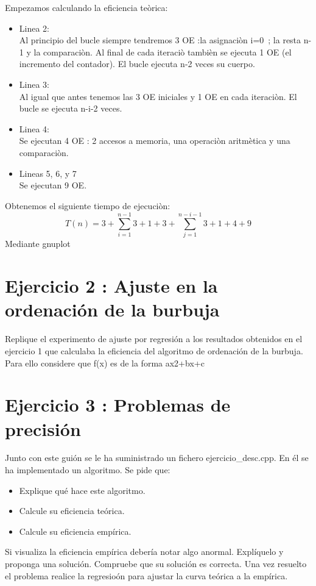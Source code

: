\documentclass{article}
\begin{document}
Empezamos calculando la eficiencia te\`orica:
\begin{itemize}
	\item Linea 2: \\ Al principio del bucle siempre tendremos 3 OE :la asignaci\`on i=0\ ; la resta  n-1 y la comparaci\`on. Al final de cada iteraci\`o tambi\`en se ejecuta 1 OE (el incremento del contador). El bucle ejecuta n-2 veces su cuerpo.
	\item Linea 3: \\ Al igual que antes tenemos las 3 OE iniciales y 1 OE en cada iteraci\`on. El bucle se ejecuta n-i-2 veces.
	\item Linea 4: \\ Se ejecutan 4 OE : 2 accesos a memoria, una operaci\`on aritm\`etica y una comparaci\`on.
	\item Lineas 5, 6, y 7 \\  Se ejecutan 9 OE.
\end{itemize}
	Obtenemos el siguiente tiempo de ejecuci\`on: 
	\begin{equation}
		T(n)= 3 + \sum\limits_{i=1}^{n-1}{3+1+3+\sum\limits_{j=1}^{n-i-1}{3+1+4+9}}
	\end{equation}
	Mediante gnuplot
	
\clearpage
\section{Ejercicio 2 : Ajuste en la ordenación de la burbuja}
Replique el experimento de ajuste por regresión a los resultados obtenidos en el ejercicio 1 que calculaba la eficiencia del algoritmo de ordenación de la burbuja. Para ello considere que f(x) es de la forma ax2+bx+c

\clearpage
\section{Ejercicio 3 : Problemas de precisión}
Junto con este guión se le ha suministrado un fichero ejercicio\_desc.cpp. En él se ha implementado un algoritmo. Se pide que:
\begin{itemize}
	\item Explique qué hace este algoritmo.
	\item Calcule su eficiencia teórica.
	\item Calcule su eficiencia empírica.
\end{itemize}
Si visualiza la eficiencia empírica debería notar algo anormal. Explíquelo y proponga una solución. Compruebe que su solución es correcta. Una vez resuelto el problema realice la regresioón para ajustar la curva teórica a la empírica.
\end{document}
